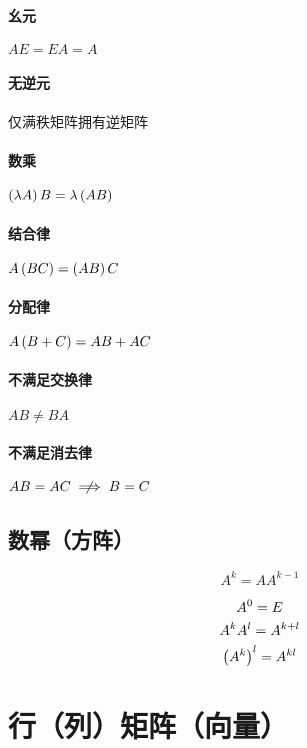 \documentclass{article}
\begin{document}
\paragraph{幺元}$AE=EA=A$

\paragraph{无逆元}仅满秩矩阵拥有逆矩阵

\paragraph{数乘}$\left(\lambda A\right)B=\lambda\left(AB\right)$

\paragraph{结合律}$A\left(BC\right)=\left(AB\right)C$

\paragraph{分配律}$A\left(B+C\right)=AB+AC$

\paragraph{不满足交换律}$AB\neq BA$

\paragraph{不满足消去律}$AB=AC\centernot\implies B=C$

\subsection{数幂（方阵）}

\begin{definition}

    \[A^k=AA^{k-1}\]

\end{definition}


\[\begin{gathered}
        A^0=E\\
        A^kA^l=A^{k+l}\\
        \left(A^k\right)^l=A^{kl}
    \end{gathered}\]

\section{行（列）矩阵（向量）}
\end{document}
